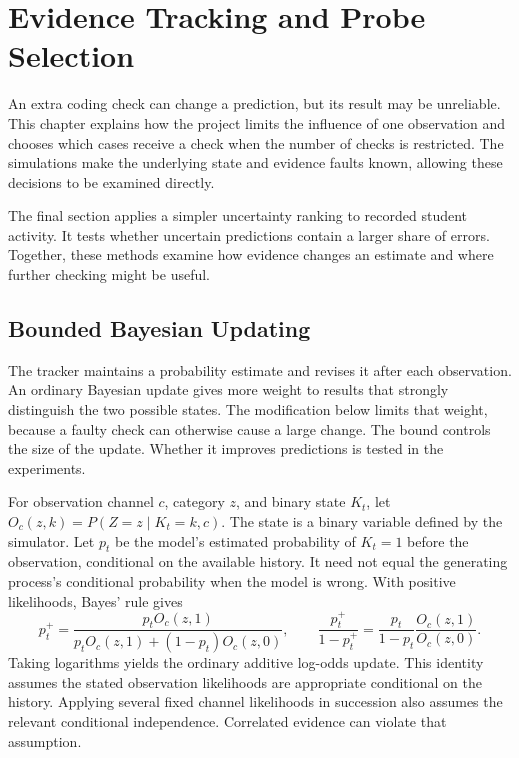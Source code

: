 \chapter{Evidence Tracking and Probe Selection}
\label{ch:method}

An extra coding check can change a prediction, but its result may be unreliable. This chapter explains how the project limits
the influence of one observation and chooses which cases receive a check when the number of checks is restricted. The
simulations make the underlying state and evidence faults known, allowing these decisions to be examined directly.

The final section applies a simpler uncertainty ranking to recorded student activity. It tests whether uncertain predictions
contain a larger share of errors. Together, these methods examine how evidence changes an estimate and where further checking
might be useful.

\section{Bounded Bayesian Updating}

The tracker maintains a probability estimate and revises it after each observation. An ordinary Bayesian update gives more
weight to results that strongly distinguish the two possible states. The modification below limits that weight, because a
faulty check can otherwise cause a large change. The bound controls the size of the update. Whether it improves predictions
is tested in the experiments.

For observation channel $c$, category $z$, and binary state $K_t$, let
$O_c(z,k)=P(Z=z\mid K_t=k,c)$. The state is a binary variable defined by the simulator.
Let $p_t$ be the model's estimated probability of $K_t=1$ before the observation, conditional on the available history.
It need not equal the generating process's conditional probability when the model is wrong. With positive likelihoods,
Bayes' rule gives
\begin{equation}
 p_t^+=\frac{p_tO_c(z,1)}{p_tO_c(z,1)+(1-p_t)O_c(z,0)},
 \qquad
 \frac{p_t^+}{1-p_t^+}=\frac{p_t}{1-p_t}\frac{O_c(z,1)}{O_c(z,0)}.
\end{equation}
Taking logarithms yields the ordinary additive log-odds update. This identity assumes the stated observation likelihoods are
appropriate conditional on the history. Applying several fixed channel likelihoods in succession also assumes the relevant
conditional independence. Correlated evidence can violate that assumption.


